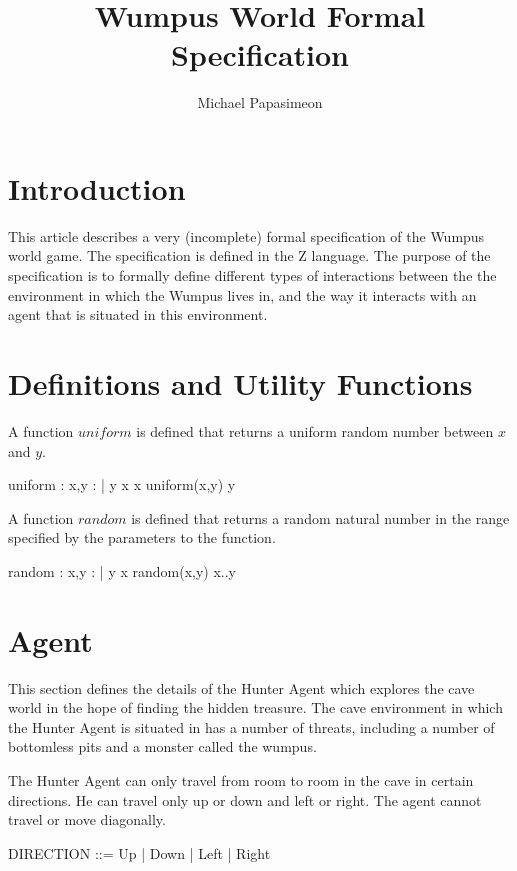 \documentclass[a4paper]{article}
\title{Wumpus World Formal Specification}
\author{Michael Papasimeon}
\date{}
\begin{document}
\maketitle

\section{Introduction}
This article describes a very (incomplete) formal specification of the Wumpus world game.
The specification is defined in the Z language. The purpose of the
specification is to formally define different types of interactions
between the the environment in which the Wumpus lives in, and the way it
interacts with an agent that is situated in this environment.

\section{Definitions and Utility Functions}
A function $uniform$ is defined that returns a uniform random number
between $x$ and $y$.
\begin{axdef}
	uniform : \nat \cross \nat \tfun \real 
\ST
	\forall x,y : \nat | y \geqslant x 
		\dot x \leqslant uniform(x,y) \leqslant y
\end{axdef}

A function $random$ is defined that returns a random natural number in
the range specified by the parameters to the function.
\begin{axdef}
	random : \natone \cross \natone \tfun \natone
\ST
	\forall x,y : \natone | y \geqslant x 
		\dot random(x,y) \in x..y
\end{axdef}

\section{Agent}
This section defines the details of the Hunter Agent which explores the
cave world in the hope of finding the hidden treasure. The cave
environment in which the Hunter Agent is situated in has a number of
threats, including a number of bottomless pits and a monster called the
wumpus.

The Hunter Agent can only travel from room to room in the cave in
certain directions. He can travel only up or down and left or right. The
agent cannot travel or move diagonally.
\begin{zed}
	DIRECTION ::= Up | Down | Left | Right
\end{zed}
\end{document}
